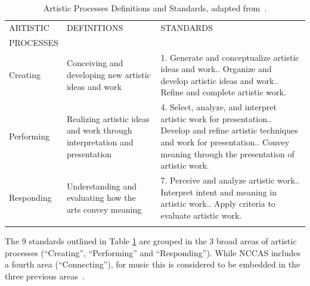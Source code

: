 \documentclass[10pt,journal,compsoc]{IEEEtran}
\begin{document}
\begin{table}[htbp]
	\caption{Artistic Processes Definitions and Standards, adapted from~\cite{NCCAS}.}
	\label{tab:AP}
	\centering
	\begin{tabular}{p{}p{}p{}}\\
		ARTISTIC & DEFINITIONS & STANDARDS\\
		PROCESSES & &\\
		\hline\noalign{\smallskip}
		Creating & Conceiving and developing new artistic ideas and work &1. Generate and conceptualize artistic ideas and work.\newline
		2. Organize and develop artistic ideas and work.\newline
		3. Refine and complete artistic work.\\
		\hline\noalign{\smallskip}
		Performing & Realizing artistic ideas and work through interpretation and presentation & 4. Select, analyze, and interpret artistic work for presentation.\newline
		5. Develop and refine artistic techniques and work for presentation.\newline
		6. Convey meaning through the presentation of artistic work.\\
		\hline\noalign{\smallskip}
		Responding & Understanding and evaluating how the arts convey meaning &
		7. Perceive and analyze artistic work.\newline
		8. Interpret intent and meaning in artistic work.\newline
		9. Apply criteria to evaluate artistic work.\\
		\hline\noalign{\smallskip}
	\end{tabular}
\end{table}

The 9 standards outlined in Table \ref{tab:AP} are grouped in the 3 broad areas of artistic processes (``Creating'', ``Performing'' and ``Responding''). While NCCAS includes a fourth area (``Connecting''), for music this is considered to be embedded in the three previous areas~\cite{NAfme}.
\end{document}
